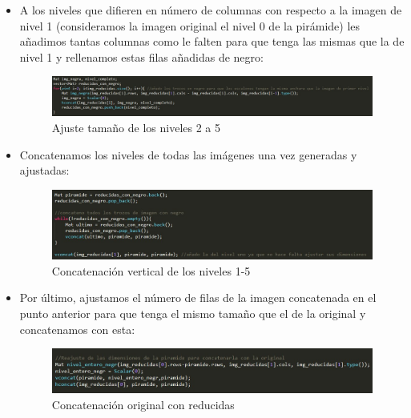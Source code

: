 \begin{itemize}
	\item A los niveles que difieren en número de columnas con respecto a la imagen de nivel 1 (consideramos la imagen original el nivel 0 de la pirámide) les añadimos tantas columnas como le falten para que tenga las mismas que la de nivel 1 y rellenamos estas filas añadidas de negro:
	
	\begin{figure}[H]
		\centering
		\includegraphics[width=1\linewidth]{niveles_negro}
		\caption{Ajuste tamaño de los niveles 2 a 5}
		\label{fig:freq_altasB}
	\end{figure}
	
	\item Concatenamos los niveles de todas las imágenes una vez generadas y ajustadas:
	
	\begin{figure}[H]
		\centering
		\includegraphics[width=1\linewidth]{concatenacion_niveles}
		\caption{Concatenación vertical de los niveles 1-5}
		\label{fig:freq_altasB}
	\end{figure}
	
	\item Por último, ajustamos el número de filas de la imagen concatenada en el punto anterior para que tenga el mismo tamaño que el de la original y concatenamos con esta:
	
		\begin{figure}[H]
			\centering
			\includegraphics[width=1\linewidth]{niveles_original}
		\caption{Concatenación original con reducidas}
		\label{fig:freq_altasB}
	\end{figure}
	
	
\end{itemize}

